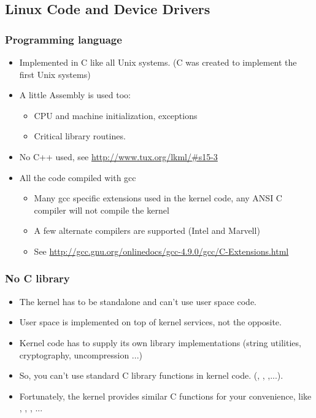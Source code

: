 \subsection{Linux Code and Device Drivers}

\begin{frame}
  \frametitle{Programming language}
  \begin{itemize}
  \item Implemented in C like all Unix systems. (C was created to
    implement the first Unix systems)
  \item A little Assembly is used too:
    \begin{itemize}
    \item CPU and machine initialization, exceptions
    \item Critical library routines.
    \end{itemize}
  \item No C++ used, see \url{http://www.tux.org/lkml/\#s15-3}
  \item All the code compiled with gcc
    \begin{itemize}
    \item Many gcc specific extensions used in the kernel code, any
      ANSI C compiler will not compile the kernel
    \item A few alternate compilers are supported (Intel and Marvell)
    \item See
      \url{http://gcc.gnu.org/onlinedocs/gcc-4.9.0/gcc/C-Extensions.html}
    \end{itemize}
  \end{itemize}
\end{frame}

\begin{frame}
  \frametitle{No C library}
  \begin{itemize}
  \item The kernel has to be standalone and can't use user space code.
  \item User space is implemented on top of kernel services, not the
    opposite.
  \item Kernel code has to supply its own library implementations
    (string utilities, cryptography, uncompression ...)
  \item So, you can't use standard C library functions in kernel code.
    (, , ,...).
  \item Fortunately, the kernel provides similar C functions for your
    convenience, like , ,
    , ...
  \end{itemize}
\end{frame}

